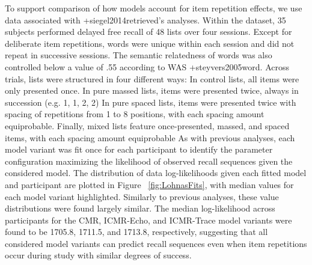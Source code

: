 \markdownRendererInterblockSeparator
{}To support comparison of how models account for item repetition effects, we use data associated with +{}{}{siegel2014retrieved}'s analyses. Within the dataset, 35 subjects performed delayed free recall of 48 lists over four sessions. Except for deliberate item repetitions, words were unique within each session and did not repeat in successive sessions. The semantic relatedness of words was also controlled below a value of .55 according to WAS +{}{}{steyvers2005word}. Across trials, lists were structured in four different ways:\markdownRendererInterblockSeparator
{}\markdownRendererOlBegin
{}In control lists, all items were only presented once.\markdownRendererOlItemEnd 
{}In pure massed lists, items were presented twice, always in succession (e.g. 1, 1, 2, 2)\markdownRendererOlItemEnd 
{}In pure spaced lists, items were presented twice with spacing of repetitions from 1 to 8 positions, with each spacing amount equiprobable.\markdownRendererOlItemEnd 
{}Finally, mixed lists feature once-presented, massed, and spaced items, with each spacing amount equiprobable\markdownRendererOlItemEnd 
\markdownRendererOlEnd \markdownRendererInterblockSeparator
{}As with previous analyses, each model variant was fit once for each participant to identify the parameter configuration maximizing the likelihood of observed recall sequences given the considered model. The distribution of data log-likelihoods given each fitted model and participant are plotted in Figure ~\ref{fig:LohnasFits}, with median values for each model variant highlighted. Similarly to previous analyses, these value distributions were found largely similar. The median log-likelihood across participants for the CMR, ICMR-Echo, and ICMR-Trace model variants were found to be 1705.8, 1711.5, and 1713.8, respectively, suggesting that all considered model variants can predict recall sequences even when item repetitions occur during study with similar degrees of success.\markdownRendererInterblockSeparator
